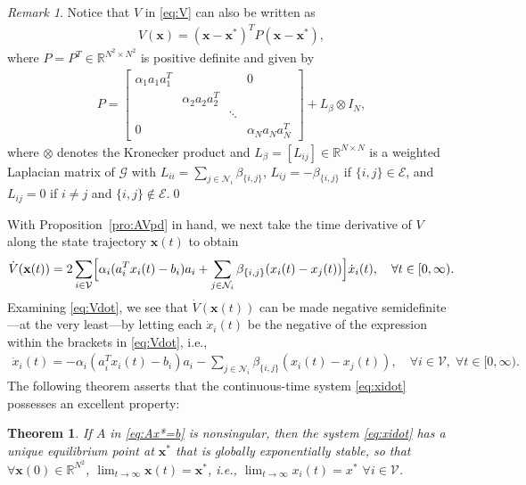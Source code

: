\documentclass[11pt]{article}
\theoremstyle{plain}
\newtheorem{theorem}{Theorem}
\theoremstyle{definition}
\theoremstyle{remark}
\newtheorem{remark}{Remark}
\begin{document}
\begin{remark}\label{rem:V}
Notice that $V$ in \eqref{eq:V} can also be written as
\begin{align*}
V(\mathbf{x})=(\mathbf{x}-\mathbf{x}^*)^TP(\mathbf{x}-\mathbf{x}^*),
\end{align*}
where $P=P^T\in\mathbb{R}^{N^2\times N^2}$ is positive definite and given by
\begin{align*}
P=\begin{bmatrix}\alpha_1a_1a_1^T & & & 0\\ & \alpha_2a_2a_2^T & &\\ & & \ddots &\\ 0 & & &\alpha_Na_Na_N^T\end{bmatrix}+L_\beta\otimes I_N,
\end{align*}
where $\otimes$ denotes the Kronecker product and $L_\beta=[L_{ij}]\in\mathbb{R}^{N\times N}$ is a weighted Laplacian matrix of $\mathcal{G}$ with $L_{ii}=\sum_{j\in\mathcal{N}_i}\beta_{\{i,j\}}$, $L_{ij}=-\beta_{\{i,j\}}$ if $\{i,j\}\in\mathcal{E}$, and $L_{ij}=0$ if $i\ne j$ and $\{i,j\}\notin\mathcal{E}$.\qed
\end{remark}

With Proposition~\ref{pro:AVpd} in hand, we next take the time derivative of $V$ along the state trajectory $\mathbf{x}(t)$ to obtain
\begin{align}
\dot{V}(\mathbf{x}(t))=2\sum_{i\in\mathcal{V}}\Bigl[\alpha_i(a_i^Tx_i(t)-b_i)a_i+\sum_{j\in\mathcal{N}_i}\beta_{\{i,j\}}(x_i(t)-x_j(t))\Bigr]\dot{x}_i(t),\quad\forall t\in[0,\infty).\label{eq:Vdot}
\end{align}
Examining \eqref{eq:Vdot}, we see that $\dot{V}(\mathbf{x}(t))$ can be made negative semidefinite---at the very least---by letting each $\dot{x}_i(t)$ be the negative of the expression within the brackets in \eqref{eq:Vdot}, i.e.,
\begin{align}
\dot{x}_i(t)=-\alpha_i(a_i^Tx_i(t)-b_i)a_i-\sum_{j\in\mathcal{N}_i}\beta_{\{i,j\}}(x_i(t)-x_j(t)),\quad\forall i\in\mathcal{V},\;\forall t\in[0,\infty).\label{eq:xidot}
\end{align}
The following theorem asserts that the continuous-time system \eqref{eq:xidot} possesses an excellent property:

\begin{theorem}\label{thm:uniqeqptges}
If $A$ in \eqref{eq:Ax*=b} is nonsingular, then the system \eqref{eq:xidot} has a unique equilibrium point at $\mathbf{x}^*$ that is globally exponentially stable, so that $\forall\mathbf{x}(0)\in\mathbb{R}^{N^2}$, $\lim_{t\rightarrow\infty}\mathbf{x}(t)=\mathbf{x}^*$, i.e., $\lim_{t\rightarrow\infty}x_i(t)=x^*$ $\forall i\in\mathcal{V}$.
\end{theorem}
\end{document}
